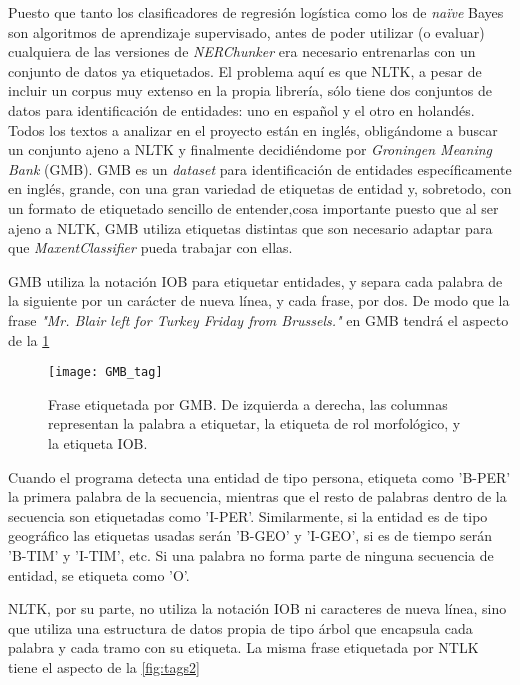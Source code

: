 \documentclass{pre-tfg}
\begin{document}

Puesto que tanto los clasificadores de regresión logística como los de \textit{naïve} Bayes son algoritmos de aprendizaje supervisado, antes de poder utilizar (o evaluar) cualquiera de las versiones de \textit{NERChunker} era necesario entrenarlas con un conjunto de datos ya etiquetados. El problema aquí es que NLTK, a pesar de incluir un corpus muy extenso en la propia librería, sólo tiene dos conjuntos de datos para identificación de entidades: uno en español y el otro en holandés. Todos los textos a analizar en el proyecto están en inglés, obligándome a buscar un conjunto ajeno a NLTK y finalmente decidiéndome por \textit{Groningen Meaning Bank} (GMB). GMB es un \textit{dataset} para identificación de entidades específicamente en inglés, grande, con una gran variedad de etiquetas de entidad y, sobretodo, con un formato de etiquetado sencillo de entender,cosa importante puesto que al ser ajeno a NLTK, GMB utiliza etiquetas distintas que son necesario adaptar para que \textit{MaxentClassifier} pueda trabajar con ellas.

GMB utiliza la notación IOB para etiquetar entidades, y separa cada palabra de la siguiente por un carácter de nueva línea, y cada frase, por dos. De modo que la frase \textit{"Mr. Blair left for Turkey Friday from Brussels."} en GMB tendrá el aspecto de la \ref{fig:tags1}

\begin{figure}[h]
	\label{fig:tags1}
	\texttt{[image: GMB\_tag]}
	\caption{Frase etiquetada por GMB. De izquierda a derecha, las columnas representan la palabra a etiquetar, la etiqueta de rol morfológico, y la etiqueta IOB.}
	\centering
\end{figure}

Cuando el programa detecta una entidad de tipo persona, etiqueta como 'B-PER' la primera palabra de la secuencia, mientras que el resto de palabras dentro de la secuencia son etiquetadas como 'I-PER'. Similarmente, si la entidad es de tipo geográfico las etiquetas usadas serán 'B-GEO' y 'I-GEO', si es de tiempo serán 'B-TIM' y 'I-TIM', etc. Si una palabra no forma parte de ninguna secuencia de entidad, se etiqueta como 'O'.

NLTK, por su parte, no utiliza la notación IOB  ni caracteres de nueva línea, sino que utiliza una estructura de datos propia de tipo árbol que encapsula cada palabra y cada tramo con su etiqueta. La misma frase etiquetada por NTLK tiene el aspecto de la \ref{fig:tags2}
\end{document}
